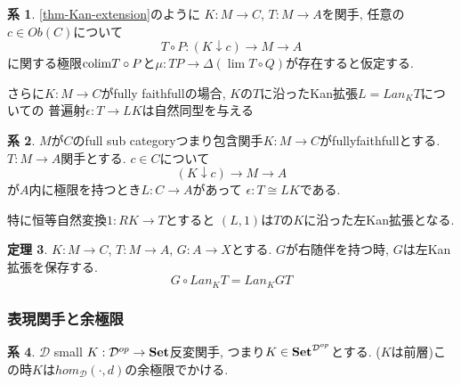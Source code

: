 \documentclass[dvipdfmx,a4paper,11pt]{article}
\newcommand{\colim}{{\rm colim}}
\theoremstyle{definition}
\newtheorem{thm}{定理}
\newtheorem{cor}[thm]{系}
\begin{document}
 \begin{tcolorbox}
 [colback = white, colframe = green!35!black, fonttitle = \bfseries,breakable = true]
\begin{cor}
\ref{thm-Kan-extension}のように
$K : M \to C$, $T : M \to A$を関手, 
任意の$c \in Ob(C)$について
$$
T \circ P : (K \downarrow c) \to M \to A
$$
に関する極限$\colim T\circ P$と$\mu:  TP \to \Delta (\lim T\circ Q)$が存在すると仮定する.

さらに$K : M \to C$がfully faithfullの場合, 
$K$の$T$に沿ったKan拡張$L = Lan_{K}T$についての
普遍射$\epsilon : T \to LK$は自然同型を与える
\end{cor}
\end{tcolorbox}

 \begin{tcolorbox}
 [colback = white, colframe = green!35!black, fonttitle = \bfseries,breakable = true]
\begin{cor}
$M$が$C$のfull sub categoryつまり包含関手$K : M \to C$がfullyfaithfullとする. 
$T : M \to A$関手とする. 
$c \in C$について
$$
( K \downarrow c) \to M \to A
$$
が$A$内に極限を持つとき$L : C \to A$があって
$\epsilon :  T \cong LK$である.

特に恒等自然変換$1: RK \to T$とすると
$(L,1)$は$T$の$K$に沿った左Kan拡張となる. 
\end{cor}
\end{tcolorbox}

 \begin{tcolorbox}
 [colback = white, colframe = green!35!black, fonttitle = \bfseries,breakable = true]
\begin{thm}
$K : M \to C$, $T : M \to A$, $G :  A \to X$とする.
$G$が右随伴を持つ時, $G$は左Kan拡張を保存する. 
$$
G \circ Lan_{K} T = Lan_{K}GT
$$
\end{thm}
\end{tcolorbox}

\subsubsection{表現関手と余極限}

 \begin{tcolorbox}
 [colback = white, colframe = green!35!black, fonttitle = \bfseries,breakable = true]
\begin{cor}
\label{cor-colim-represent}
$\mathcal{D}$ small 
$K : \mathcal{D}^{op} \to {\bf Set}$反変関手, つまり$K \in {\bf Set}^{\mathcal{D}^{op}}$とする. ($K$は前層)この時$K$は$hom_{\mathcal{D}}(\cdot, d)$の余極限でかける. 
\end{cor}
\end{tcolorbox}
\end{document}
